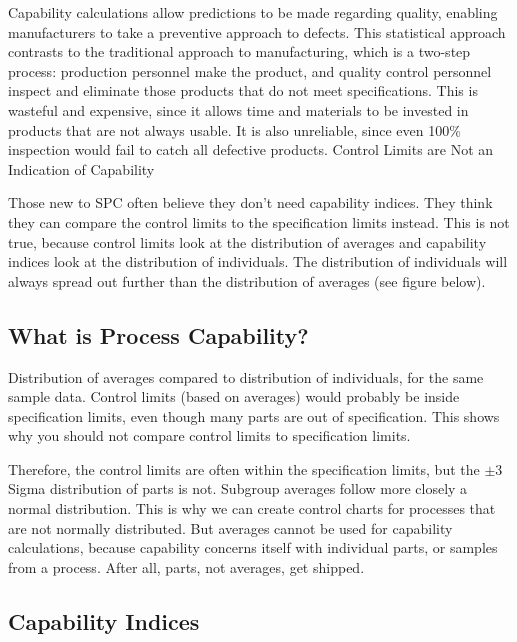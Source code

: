 \documentclass[11pt]{article} %
\begin{document}
Capability calculations allow predictions to be made regarding quality, enabling manufacturers to take a preventive approach to defects. This statistical approach contrasts to the traditional approach to manufacturing, which is a two-step process: production personnel make the product, and quality control personnel inspect and eliminate those products that do not meet specifications. This is wasteful and expensive, since it allows time and materials to be invested in products that are not always usable. It is also unreliable, since even 100\% inspection would fail to catch all defective products.
Control Limits are Not an Indication of Capability

Those new to SPC often believe they don’t need capability indices. They think they can compare the control limits to the specification limits instead. This is not true, because control limits look at the distribution of averages and capability indices look at the distribution of individuals. The distribution of individuals will always spread out further than the distribution of averages (see figure below). 
\subsection{What is Process Capability?}

Distribution of averages compared to distribution of individuals, for the same sample data. Control limits (based on averages) would probably be inside specification limits, even though many parts are out of specification. This shows why you should not compare control limits to specification limits.

Therefore, the control limits are often within the specification limits, but the $\pm 3$ Sigma distribution of parts is not.  Subgroup averages follow more closely a normal distribution. This is why we can create control charts for processes that are not normally distributed. But averages cannot be used for capability calculations, because capability concerns itself with individual parts, or samples from a process. After all, parts, not averages, get shipped.

\subsection{Capability Indices}
\end{document}
